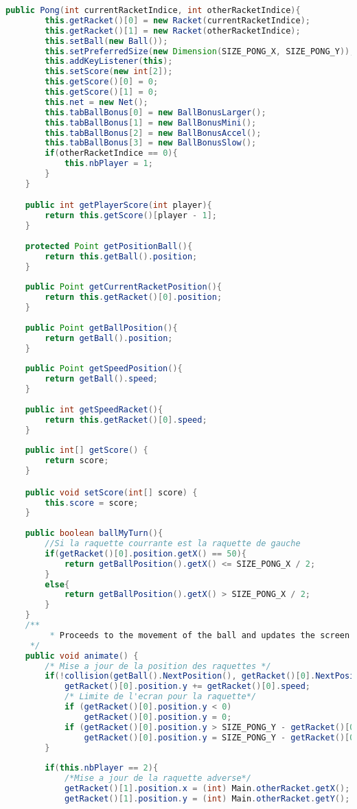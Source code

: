 \begin{lstlisting}[language=Java]
	public Pong(int currentRacketIndice, int otherRacketIndice){
		this.getRacket()[0] = new Racket(currentRacketIndice);
		this.getRacket()[1] = new Racket(otherRacketIndice);
		this.setBall(new Ball());
		this.setPreferredSize(new Dimension(SIZE_PONG_X, SIZE_PONG_Y));
		this.addKeyListener(this);
		this.setScore(new int[2]);
		this.getScore()[0] = 0;
		this.getScore()[1] = 0;
		this.net = new Net();
		this.tabBallBonus[0] = new BallBonusLarger();
		this.tabBallBonus[1] = new BallBonusMini();
		this.tabBallBonus[2] = new BallBonusAccel();
		this.tabBallBonus[3] = new BallBonusSlow();
		if(otherRacketIndice == 0){
			this.nbPlayer = 1;
		}
	}

	public int getPlayerScore(int player){
		return this.getScore()[player - 1];
	}
	
	protected Point getPositionBall(){
		return this.getBall().position;
	}
	
	public Point getCurrentRacketPosition(){
		return this.getRacket()[0].position;
	}
	
	public Point getBallPosition(){
		return getBall().position;
	}
	
	public Point getSpeedPosition(){
		return getBall().speed;
	}
	
	public int getSpeedRacket(){
		return this.getRacket()[0].speed;
	}
	
	public int[] getScore() {
		return score;
	}

	public void setScore(int[] score) {
		this.score = score;
	}
	
	public boolean ballMyTurn(){
		//Si la raquette courrante est la raquette de gauche
		if(getRacket()[0].position.getX() == 50){
			return getBallPosition().getX() <= SIZE_PONG_X / 2;
		}
		else{
			return getBallPosition().getX() > SIZE_PONG_X / 2;
		}
	}
	/**
         * Proceeds to the movement of the ball and updates the screen
	 */
	public void animate() {
		/* Mise a jour de la position des raquettes */
		if(!collision(getBall().NextPosition(), getRacket()[0].NextPosition())){ //Notre raquette
			getRacket()[0].position.y += getRacket()[0].speed;
			/* Limite de l'ecran pour la raquette*/
			if (getRacket()[0].position.y < 0)								
				getRacket()[0].position.y = 0;
			if (getRacket()[0].position.y > SIZE_PONG_Y - getRacket()[0].height)	
				getRacket()[0].position.y = SIZE_PONG_Y - getRacket()[0].height;
		}
		 
		if(this.nbPlayer == 2){				
			/*Mise a jour de la raquette adverse*/
			getRacket()[1].position.x = (int) Main.otherRacket.getX();
			getRacket()[1].position.y = (int) Main.otherRacket.getY();
			

\end{lstlisting}

